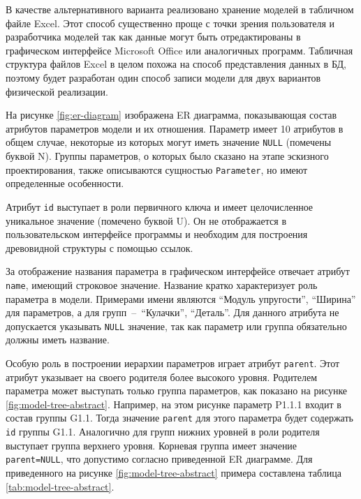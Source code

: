 \documentclass[14pt,oneside,final]{extreport}
\begin{document}
	В качестве альтернативного варианта реализовано хранение моделей в табличном файле Excel. Этот способ существенно проще с точки зрения пользователя и разработчика моделей так как данные могут быть отредактированы в графическом интерфейсе Microsoft Office или аналогичных программ. Табличная структура файлов Excel в целом похожа на способ представления данных в БД, поэтому будет разработан один способ записи модели для двух вариантов физической реализации.
	
	На рисунке \ref{fig:er-diagram} изображена ER диаграмма, показывающая состав атрибутов параметров модели и их отношения. Параметр имеет 10 атрибутов в общем случае, некоторые из которых могут иметь значение \texttt{NULL} (помечены буквой N). Группы параметров, о которых было сказано на этапе эскизного проектирования, также описываются сущностью \texttt{Parameter}, но имеют определенные особенности. 
	
	Атрибут \texttt{id} выступает в роли первичного ключа и имеет целочисленное уникальное значение (помечено буквой U). Он не отображается в пользовательском интерфейсе программы и необходим для построения древовидной структуры с помощью ссылок. 
	
	За отображение названия параметра в графическом интерфейсе отвечает атрибут \texttt{name}, имеющий строковое значение. Название кратко характеризует роль параметра в модели. Примерами имени являются ``Модуль упругости'',  ``Ширина'' для параметров, а для групп~--~``Кулачки'', ``Деталь''. Для данного атрибута не допускается указывать \texttt{NULL} значение, так как параметр или группа обязательно должны иметь название.

	Особую роль в построении иерархии параметров играет атрибут \texttt{parent}. Этот атрибут указывает на своего родителя более высокого уровня. Родителем параметра может выступать только группа параметров, как показано на рисунке \ref{fig:model-tree-abstract}. Например, на этом рисунке параметр P1.1.1 входит в состав группы G1.1. Тогда значение \texttt{parent} для этого параметра будет содержать \texttt{id} группы G1.1. Аналогично для групп нижних уровней в роли родителя выступает группа верхнего уровня. Корневая группа имеет значение \texttt{parent=NULL}, что допустимо согласно приведенной ER диаграмме. Для приведенного на рисунке \ref{fig:model-tree-abstract} примера составлена таблица \ref{tab:model-tree-abstract}.
		
\end{document}
